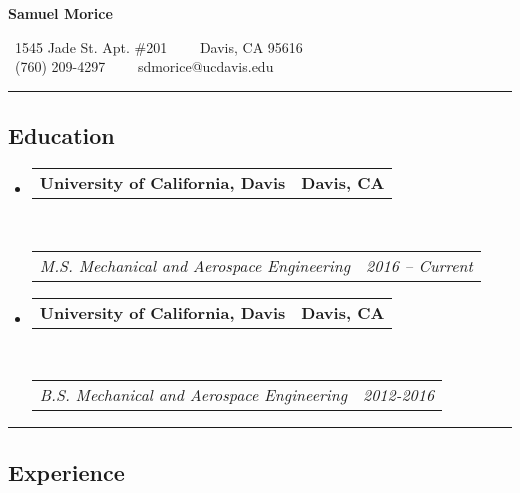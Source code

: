 \documentclass[10pt,letterpaper]{article}
\makeatletter
\newcommand{\headerrow}[2]
{\begin{tabular*}{\linewidth}{l@{\extracolsep{\fill}}r}
	#1 &
	#2 \\
\end{tabular*}}
\makeatother
\begin{document}
\begin{center}
{\LARGE \textbf{Samuel Morice}}

\ 1545 Jade St. Apt. \#201\ \ \textbullet
\ \ Davis, CA 95616
\\
\ (760) 209-4297\ \ \textbullet
\ \ sdmorice@ucdavis.edu
\end{center}

\hrule
\vspace{-0.3em}
\subsection*{Education}

\begin{itemize}
	\parskip=0.1em

	\item
	\headerrow
		{\textbf{University of California, Davis}}
		{\textbf{Davis, CA}}
	\\
	\headerrow
		{\emph{M.S. Mechanical and Aerospace Engineering}}
		{\emph{2016 -- Current}}

	\item
	\headerrow
		{\textbf{University of California, Davis}}
		{\textbf{Davis, CA}}
	\\
	\headerrow
		{\emph{B.S. Mechanical and Aerospace Engineering}}
		{\emph{2012-2016}}
	
\end{itemize}

\hrule
\vspace{-0.3em}
\subsection*{Experience}
\end{document}
